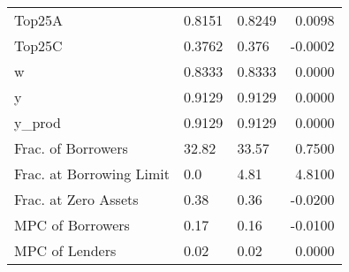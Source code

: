 \begin{table}
\begin{tabular}{lllr}
                  Top25A &  0.8151 &   0.8249 &  0.0098 \\
                  Top25C &  0.3762 &    0.376 & -0.0002 \\
                       w &  0.8333 &   0.8333 &  0.0000 \\
                       y &  0.9129 &   0.9129 &  0.0000 \\
                  y\_prod &  0.9129 &   0.9129 &  0.0000 \\
      Frac. of Borrowers &   32.82 &    33.57 &  0.7500 \\
Frac. at Borrowing Limit &     0.0 &     4.81 &  4.8100 \\
    Frac. at Zero Assets &    0.38 &     0.36 & -0.0200 \\
        MPC of Borrowers &    0.17 &     0.16 & -0.0100 \\
          MPC of Lenders &    0.02 &     0.02 &  0.0000 \\
\bottomrule
\end{tabular}
\end{table}
